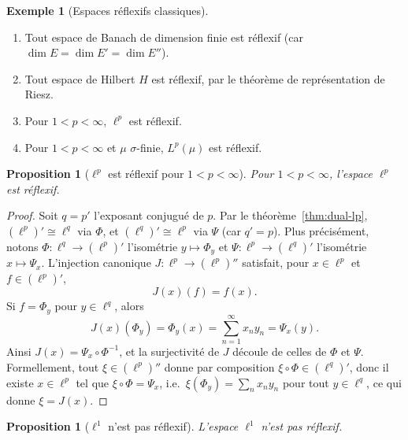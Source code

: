 \documentclass[a4paper,12pt]{book}
\theoremstyle{definition}
\newtheorem{exemple}[definition]{Exemple}
\theoremstyle{plain}
\newtheorem{proposition}[definition]{Proposition}
\theoremstyle{remark}
\begin{document}
\begin{exemple}[Espaces réflexifs classiques]
\label{ex:reflexifs}
\begin{enumerate}[label=(\roman*)]
  \item{} Tout espace de Banach de dimension finie
    est réflexif (car $\dim E = \dim E' = \dim E''$).
  \item{} Tout espace de Hilbert $H$ est réflexif, par le
    théorème de représentation de Riesz.
  \item{} Pour $1 < p < \infty$, $\ell^p$ est réflexif.
  \item{} Pour $1 < p < \infty$ et $\mu$ $\sigma$-finie, $L^p(\mu)$ est réflexif.
\end{enumerate}
\end{exemple}

\begin{proposition}[{$\ell^p$ est réflexif pour $1 < p < \infty$}]
\label{prop:lp-reflexif}
Pour $1 < p < \infty$, l'espace $\ell^p$ est réflexif.
\end{proposition}

\begin{proof}
Soit $q = p'$ l'exposant conjugué de $p$. Par le théorème~\ref{thm:dual-lp},
$(\ell^p)' \cong \ell^q$ via $\Phi$, et $(\ell^q)' \cong \ell^p$ via $\Psi$
(car $q' = p$). Plus précisément, notons $\Phi : \ell^q \to (\ell^p)'$
l'isométrie $y \mapsto \Phi_y$ et $\Psi : \ell^p \to (\ell^q)'$ l'isométrie
$x \mapsto \Psi_x$. L'injection canonique $J : \ell^p \to (\ell^p)''$
satisfait, pour $x \in \ell^p$ et $f \in (\ell^p)'$,
\[
  J(x)(f) = f(x).
\]
Si $f = \Phi_y$ pour $y \in \ell^q$, alors
\[
  J(x)(\Phi_y) = \Phi_y(x) = \sum_{n=1}^{\infty} x_n y_n = \Psi_x(y).
\]
Ainsi $J(x) = \Psi_x \circ \Phi^{-1}$, et la surjectivité de $J$ découle de celles
de $\Phi$ et $\Psi$. Formellement, tout $\xi \in (\ell^p)''$ donne par composition
$\xi \circ \Phi \in (\ell^q)'$, donc il existe $x \in \ell^p$ tel que
$\xi \circ \Phi = \Psi_x$, i.e.\ $\xi(\Phi_y) = \sum_{n} x_n y_n$ pour tout
$y \in \ell^q$, ce qui donne $\xi = J(x)$.
\end{proof}

\begin{proposition}[$\ell^1$ n'est pas réflexif]
\label{prop:l1-non-reflexif}
L'espace $\ell^1$ n'est pas réflexif.
\end{proposition}
\end{document}
